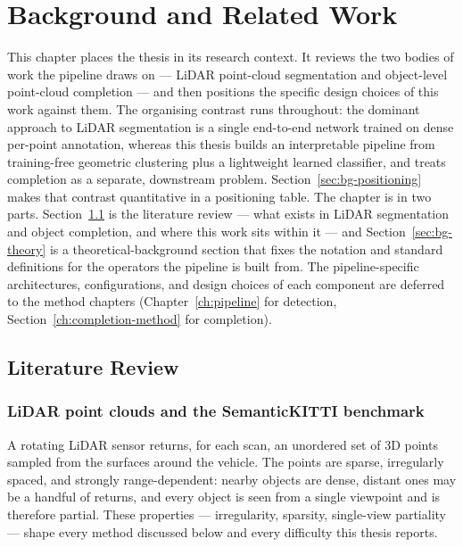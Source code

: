 \chapter{Background and Related Work}
\label{ch:background}

This chapter places the thesis in its research context. It reviews the two bodies of
work the pipeline draws on --- LiDAR point-cloud segmentation and object-level
point-cloud completion --- and then positions the specific design choices of this
work against them. The organising contrast runs throughout: the dominant approach to
LiDAR segmentation is a single end-to-end network trained on dense per-point
annotation, whereas this thesis builds an interpretable pipeline from training-free
geometric clustering plus a lightweight learned classifier, and treats completion as a
separate, downstream problem. Section~\ref{sec:bg-positioning} makes that contrast
quantitative in a positioning table. The chapter is in two parts. Section~\ref{sec:bg-litreview} is the literature review ---
what exists in LiDAR segmentation and object completion, and where this work sits within it
--- and Section~\ref{sec:bg-theory} is a theoretical-background section that fixes the
notation and standard definitions for the operators the pipeline is built from. The
pipeline-specific architectures, configurations, and design choices of each component are
deferred to the method chapters (Chapter~\ref{ch:pipeline} for detection,
Section~\ref{ch:completion-method} for completion).

\section{Literature Review}
\label{sec:bg-litreview}

\subsection{LiDAR point clouds and the SemanticKITTI benchmark}
\label{sec:bg-dataset}

A rotating LiDAR sensor returns, for each scan, an unordered set of 3D points sampled
from the surfaces around the vehicle. The points are sparse, irregularly spaced, and
strongly range-dependent: nearby objects are dense, distant ones may be a handful of
returns, and every object is seen from a single viewpoint and is therefore partial.
These properties --- irregularity, sparsity, single-view partiality --- shape every
method discussed below and every difficulty this thesis reports.

